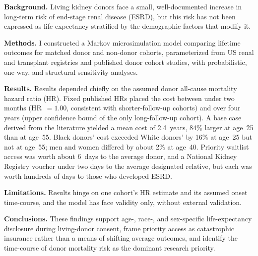 \textbf{Background.} Living kidney donors face a small, well-documented increase in long-term risk of end-stage renal disease (ESRD), but this risk has not been expressed as life expectancy stratified by the demographic factors that modify it.

\textbf{Methods.} I constructed a Markov microsimulation model comparing lifetime outcomes for matched donor and non-donor cohorts, parameterized from US renal and transplant registries and published donor cohort studies, with probabilistic, one-way, and structural sensitivity analyses.

\textbf{Results.} Results depended chiefly on the assumed donor all-cause mortality hazard ratio (HR). Fixed published HRs placed the cost between under two months (HR~$=1.00$, consistent with shorter-follow-up cohorts) and over four years (upper confidence bound of the only long-follow-up cohort). A base case derived from the literature yielded a mean cost of 2.4~years, 84\% larger at age~25 than at age~55. Black donors' cost exceeded White donors' by 16\% at age~25 but not at age~55; men and women differed by about 2\% at age~40. Priority waitlist access was worth about 6~days to the average donor, and a National Kidney Registry voucher under two days to the average designated relative, but each was worth hundreds of days to those who developed ESRD.

\textbf{Limitations.} Results hinge on one cohort's HR estimate and its assumed onset time-course, and the model has face validity only, without external validation.

\textbf{Conclusions.} These findings support age-, race-, and sex-specific life-expectancy disclosure during living-donor consent, frame priority access as catastrophic insurance rather than a means of shifting average outcomes, and identify the time-course of donor mortality risk as the dominant research priority.
